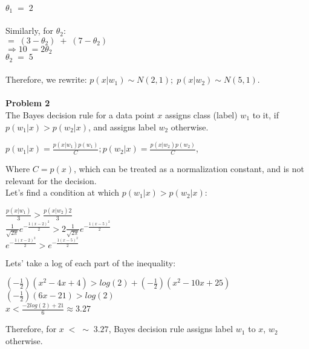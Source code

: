 \documentclass[11pt]{article}
\begin{document}
$\theta_1 \; = \; 2$ \\ \\
Similarly, for $\theta_2$:\\
$=\; (3-\theta_2)\; +\; (7-\theta_2)\;$ \\
$\Rightarrow 10 \; = 2\theta_2$\\
$\theta_2 \; = \; 5$ \\ \\
Therefore, we rewrite: $p(x|w_1) \sim N(2,1); \; p(x|w_2) \sim N(5,1). $ \\ \\
\textbf{Problem 2}\\
The Bayes decision rule for a data point $x$ assigns class (label) $w_1$ to it, if $p(w_1|x) > p(w_2|x)$,
and assigns label $w_2$ otherwise.
\begin{center}
$p(w_1|x) = \frac{p(x|w_1)p(w_1)}{C}; p(w_2|x)= \frac{p(x|w_2)p(w_2)}{C}$,
\end{center}
Where $C = p(x)$, which can be treated as a normalization constant, and is not relevant for the decision.\\
Let's find a condition at which $p(w_1|x) > p(w_2|x)$:\\
\begin{center}
  $\frac{p(x|w_1)}{3}> \frac {p(x|w_2)2}{3}$\\
  $\frac{1}{\sqrt{2\pi}}e^{-\frac{1(x-2)^2}{2}} > 2 \frac{1}{\sqrt{2\pi}}e^{-\frac{1(x-5)^2}{2}}$\\
  $e^{-\frac{1(x-2)^2}{2}} > e^{-\frac{1(x-5)^2}{2}}$\\
\end{center}
Lets' take a log of each part of the inequality:
\begin{center}
  $(-\frac{1}{2})(x^2-4x+4) > log(2) + (-\frac{1}{2})(x^2-10x+25)$\\
  $(-\frac{1}{2})(6x-21) > log(2)$\\
  $x < \frac{-2log(2) + 21}{6} \approx 3.27$
\end{center}
Therefore, for $x\; <\; \sim \; 3.27$, Bayes decision rule assigns label $w_1$ to $x$, $w_2$ otherwise.
\end{document}
